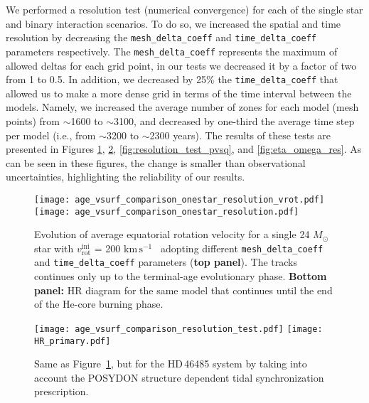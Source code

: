 \documentclass{aa}
\newcommand{\kms}{$\mathrm{km\,s^{-1}}$}
\DeclareRobustCommand{\Figref}[1]{Figure~\ref{#1}}
\begin{document}
\begin{appendix}
We performed a resolution test (numerical convergence) for each of the single star and binary interaction scenarios. To do so, we increased the spatial and time resolution by decreasing the \texttt{mesh\_delta\_coeff} and \texttt{time\_delta\_coeff} parameters respectively.
The \texttt{mesh\_delta\_coeff}  represents the maximum of allowed deltas for each grid point, in our tests we decreased it by a factor of two from 1 to 0.5. In addition, we decreased by 25\% the \texttt{time\_delta\_coeff} that allowed us to make a more dense grid in terms of the time interval between the models.
Namely, we increased the average number of zones for each model (mesh points) from $\sim$1600 to $\sim$3100, and decreased by one-third the average time step per model (i.e., from $\sim$3200 to $\sim$2300 years).
The results of these tests are presented in Figures \ref{fig:resolution_test_one_star}, \ref{fig:resolution_test_tides}, \ref{fig:resolution_test_pvsq}, and \ref{fig:eta_omega_res}. As can be seen in these figures, the change is smaller than observational uncertainties, highlighting the reliability of our results.


\begin{figure}[!ht]
  \centering

  \texttt{[image: age\_vsurf\_comparison\_onestar\_resolution\_vrot.pdf]}
  \texttt{[image: age\_vsurf\_comparison\_onestar\_resolution.pdf]}
  \caption{Evolution of average equatorial rotation
    velocity for a single 24 $M_{\odot}$ star with $v_\mathrm{rot}^\mathrm{ini}$ =
    200 \kms~ adopting different \texttt{mesh\_delta\_coeff} and
    \texttt{time\_delta\_coeff} parameters ({\bf top panel}). The tracks continues only
    up to the terminal-age evolutionary phase.  {\bf Bottom panel:}
     HR diagram for the same model that continues until the end of
    the He-core burning phase.}
  \label{fig:resolution_test_one_star}
\end{figure}


\begin{figure}[!ht]
  \centering
  \texttt{[image: age\_vsurf\_comparison\_resolution\_test.pdf]}
\texttt{[image: HR\_primary.pdf]}
  \caption{Same as \Figref{fig:resolution_test_one_star}, but for the HD\,46485 system by taking into account the POSYDON structure dependent tidal synchronization prescription.}
  \label{fig:resolution_test_tides}
\end{figure}




\end{appendix}
\end{document}
